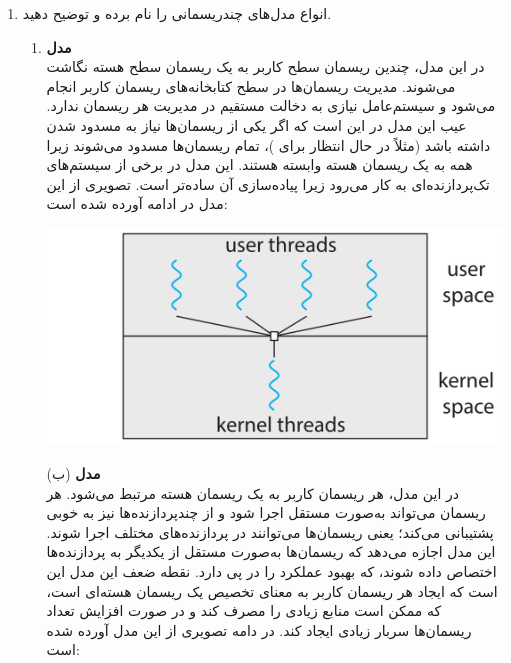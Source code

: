\begin{enumerate}
	\item 
		انواع مدل‌های چندریسمانی را نام برده و توضیح دهید.
		
		\begin{qsolve}
			\begin{enumerate}
				\item 
				\textbf{مدل }\\
				در این مدل، چندین ریسمان سطح کاربر به یک ریسمان سطح هسته نگاشت می‌شوند. مدیریت ریسمان‌ها در سطح کتابخانه‌های ریسمان کاربر انجام می‌شود و سیستم‌عامل نیازی به دخالت مستقیم در مدیریت هر ریسمان ندارد. عیب این مدل در این است که اگر یکی از ریسمان‌ها نیاز به مسدود شدن داشته باشد (مثلاً در حال انتظار برای )، تمام ریسمان‌ها مسدود می‌شوند زیرا همه به یک ریسمان هسته وابسته هستند. این مدل در برخی از سیستم‌های تک‌پردازنده‌ای به کار می‌رود زیرا پیاده‌سازی آن ساده‌تر است. تصویری از این مدل در ادامه آورده شده است:
				
				
				\begin{center}
					\includegraphics*[width=0.6\linewidth]{pics/img1.png}
				\end{center}
			\end{enumerate}
		\end{qsolve}
		
		
		\begin{qsolve}
		\begin{enumerate}
			\item [(ب)]
			\textbf{مدل \lr{One-to-One}}\\
			در این مدل، هر ریسمان کاربر به یک ریسمان هسته مرتبط می‌شود.
			هر ریسمان می‌تواند به‌صورت مستقل اجرا شود و از چندپردازنده‌ها نیز به خوبی پشتیبانی می‌کند؛ یعنی ریسمان‌ها می‌توانند در پردازنده‌های مختلف اجرا شوند.
			این مدل اجازه می‌دهد که ریسمان‌ها به‌صورت مستقل از یکدیگر به پردازنده‌ها اختصاص داده شوند، که بهبود عملکرد را در پی دارد.
			نقطه ضعف این مدل این است که ایجاد هر ریسمان کاربر به معنای تخصیص یک ریسمان هسته‌ای است، که ممکن است منابع زیادی را مصرف کند و در صورت افزایش تعداد ریسمان‌ها سربار زیادی ایجاد کند. در دامه تصویری از این مدل آورده شده است:
			

\end{enumerate}
\end{qsolve}
\end{enumerate}
